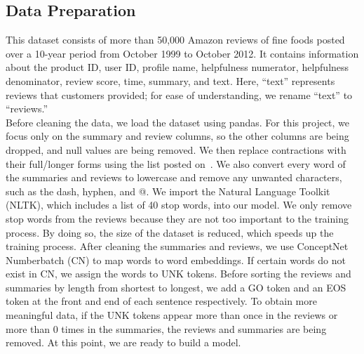 \documentclass[conference]{IEEEtran}
\begin{document}
\subsection{Data Preparation}
This dataset consists of more than 50,000 Amazon reviews of fine foods posted over a 10-year period from October 1999 to October 2012. It contains information about the product ID, user ID, profile name, helpfulness numerator, helpfulness denominator, review score, time, summary, and text. Here, “text” represents reviews that customers provided; for ease of understanding, we rename “text” to “reviews.” \\
\indent Before cleaning the data, we load the dataset using pandas. For this project, we focus only on the summary and review columns, so the other columns are being dropped, and null values are being removed. We then replace contractions with their full/longer forms using the list posted on~\cite{unknown}. We also convert every word of the summaries and reviews to lowercase and remove any unwanted characters, such as the dash, hyphen, and @. We import the Natural Language Toolkit (NLTK), which includes a list of 40 stop words, into our model. We only remove stop words from the reviews because they are not too important to the training process. By doing so, the size of the dataset is reduced, which speeds up the training process. After cleaning the summaries and reviews, we use ConceptNet Numberbatch (CN) to map words to word embeddings. If certain words do not exist in CN, we assign the words to UNK tokens. Before sorting the reviews and summaries by length from shortest to longest, we add a GO token and an EOS token at the front and end of each sentence respectively. To obtain more meaningful data, if the UNK tokens appear more than once in the reviews or more than 0 times in the summaries, the reviews and summaries are being removed. At this point, we are ready to build a model.
\end{document}
